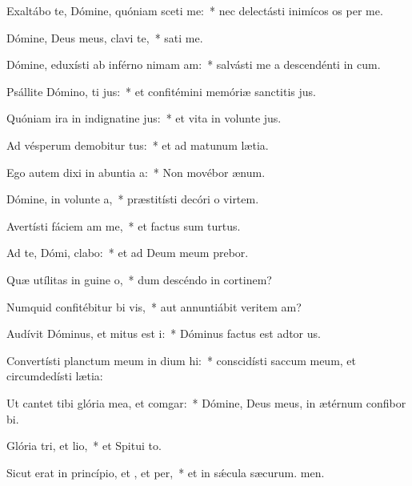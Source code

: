 \item Exaltábo te, Dómine, quóniam sceti me:~* nec delectásti inimícos os per me.
\item Dómine, Deus meus, clavi  te,~*  sati me.
\item Dómine, eduxísti ab inférno nimam am:~* salvásti me a descendénti in cum.
\item Psállite Dómino, ti jus:~* et confitémini memóriæ sanctitis jus.
\item Quóniam ira in indignatine jus:~* et vita in volunte jus.
\item Ad vésperum demobitur tus:~* et ad matunum lætia.
\item Ego autem dixi in abuntia a:~* Non movébor  ænum.
\item Dómine, in volunte a,~* præstitísti decóri o virtem.
\item Avertísti fáciem am  me,~* et factus sum turtus.
\item Ad te, Dómi, clabo:~* et ad Deum meum prebor.
\item Quæ utílitas in guine o,~* dum descéndo in cortinem?
\item Numquid confitébitur bi vis,~* aut annuntiábit veritem am?
\item Audívit Dóminus, et mitus est i:~* Dóminus factus est adtor us.
\item Convertísti planctum meum in dium hi:~* conscidísti saccum meum, et circumdedísti  lætia:
\item Ut cantet tibi glória mea, et  comgar:~* Dómine, Deus meus, in ætérnum confibor bi.
\item Glória tri, et lio,~* et Spitui to.
\item Sicut erat in princípio, et , et per,~* et in sǽcula sæcurum. men.
